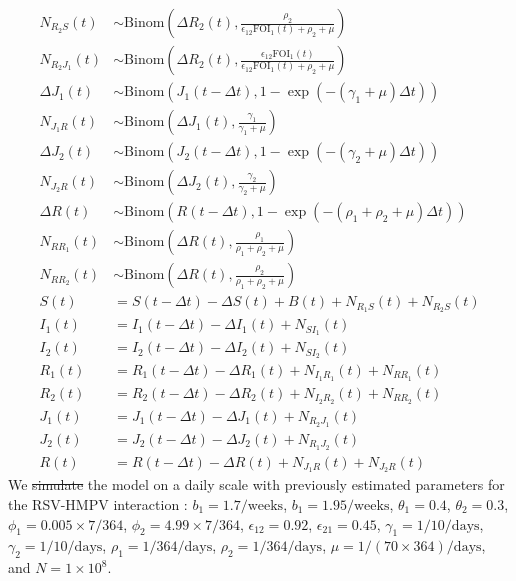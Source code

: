 \documentclass[12pt]{article}
\providecommand{\DIFaddtex}[1]{{\protect\color{blue}\uwave{#1}}} %
\providecommand{\DIFdeltex}[1]{{\protect\color{red}\sout{#1}}}                      %
\providecommand{\DIFaddbegin}{} %
\providecommand{\DIFaddend}{} %
\providecommand{\DIFdelbegin}{} %
\providecommand{\DIFdelend}{} %
\providecommand{\DIFadd}[1]{\texorpdfstring{\DIFaddtex{#1}}{#1}} %
\providecommand{\DIFdel}[1]{\texorpdfstring{\DIFdeltex{#1}}{}} %
\newcommand{\DIFscaledelfig}{0.5}
\newlength{\DIFdelgraphicswidth} %
\newlength{\DIFdelgraphicsheight} %
\newcommand{\DIFaddincludegraphics}[2][]{{\color{blue}\fbox{\DIFOincludegraphics[#1]{#2}}}} %
\newcommand{\DIFdelincludegraphics}[2][]{%
\sbox{\DIFdelgraphicsbox}{\DIFOincludegraphics[#1]{#2}}%
\settoboxwidth{\DIFdelgraphicswidth}{\DIFdelgraphicsbox} %
\settoboxtotalheight{\DIFdelgraphicsheight}{\DIFdelgraphicsbox} %
\scalebox{\DIFscaledelfig}{%
\parbox[b]{\DIFdelgraphicswidth}{\usebox{\DIFdelgraphicsbox}\\[-\baselineskip] \rule{\DIFdelgraphicswidth}{0em}}\llap{\resizebox{\DIFdelgraphicswidth}{\DIFdelgraphicsheight}{%
\setlength{\unitlength}{\DIFdelgraphicswidth}%
\begin{picture}(1,1)%
\thicklines\linethickness{2pt} %
{\color[rgb]{1,0,0}\put(0,0){\framebox(1,1){}}}%
{\color[rgb]{1,0,0}\put(0,0){\line( 1,1){1}}}%
{\color[rgb]{1,0,0}\put(0,1){\line(1,-1){1}}}%
\end{picture}%
}\hspace*{3pt}}} %
} %
\DeclareRobustCommand{\DIFaddbegin}{\DIFOaddbegin \let\includegraphics\DIFaddincludegraphics} %
\DeclareRobustCommand{\DIFaddend}{\DIFOaddend \let\includegraphics\DIFOincludegraphics} %
\DeclareRobustCommand{\DIFdelbegin}{\DIFOdelbegin \let\includegraphics\DIFdelincludegraphics} %
\DeclareRobustCommand{\DIFdelend}{\DIFOaddend \let\includegraphics\DIFOincludegraphics} %
\begin{document}
\begin{align}
N_{R_2S}(t) &\sim \mathrm{Binom}\left(\Delta R_2(t), \frac{\rho_2}{\epsilon_{12} \textrm{FOI}_1(t) + \rho_2 + \mu} \right)\\
N_{R_2J_1}(t) &\sim \mathrm{Binom}\left(\Delta R_2(t), \frac{\epsilon_{12} \textrm{FOI}_1(t)}{\epsilon_{12} \textrm{FOI}_1(t) + \rho_2 + \mu} \right)\\
\Delta J_1(t) &\sim \mathrm{Binom}\left(J_1(t-\Delta t), 1- \exp(-(\gamma_1 + \mu) \Delta t )\right) \\
N_{J_1R}(t) &\sim \mathrm{Binom}\left(\Delta J_1(t), \frac{\gamma_1}{\gamma_1 + \mu} \right)\\
\Delta J_2(t) &\sim \mathrm{Binom}\left(J_2(t-\Delta t), 1- \exp(-(\gamma_2 + \mu) \Delta t )\right) \\
N_{J_2R}(t) &\sim \mathrm{Binom}\left(\Delta J_2(t), \frac{\gamma_2}{\gamma_2 + \mu} \right)\\
\Delta R(t) &\sim \mathrm{Binom}\left(R(t-\Delta t), 1- \exp(-(\rho_1 + \rho_2 + \mu) \Delta t )\right) \\
N_{RR_1}(t) &\sim \mathrm{Binom}\left(\Delta R(t), \frac{\rho_1}{\rho_1 + \rho_2 + \mu} \right)\\
N_{RR_2}(t) &\sim \mathrm{Binom}\left(\Delta R(t), \frac{\rho_2}{\rho_1 + \rho_2 + \mu} \right)\\
S(t) &= S(t-\Delta t) - \Delta S(t) + B(t) + N_{R_1S}(t) + N_{R_2S}(t)\\
I_1(t) &= I_1(t-\Delta t) - \Delta I_1(t) + N_{SI_1}(t) \\
I_2(t) &= I_2(t-\Delta t) - \Delta I_2(t) + N_{SI_2}(t) \\
R_1(t) &= R_1(t-\Delta t) - \Delta R_1(t) + N_{I_1R_1}(t) + N_{RR_1}(t)\\
R_2(t) &= R_2(t-\Delta t) - \Delta R_2(t) + N_{I_2R_2}(t) + N_{RR_2}(t)\\
J_1(t) &= J_1(t-\Delta t) - \Delta J_1(t) + N_{R_2J_1}(t) \\
J_2(t) &= J_2(t-\Delta t) - \Delta J_2(t) + N_{R_1J_2}(t) \\
R(t) &= R(t-\Delta t) - \Delta R(t) + N_{J_1 R}(t) + N_{J_2 R}(t) 
\end{align}
We \DIFdelbegin \DIFdel{simulate }\DIFdelend \DIFaddbegin \DIFadd{simulated }\DIFaddend the model on a daily scale with previously estimated parameters for the RSV-HMPV interaction \citep{bhattacharyya2015cross}:
$b_1=1.7/\mathrm{weeks}$, $b_1=1.95/\mathrm{weeks}$, $\theta_1 = 0.4$, $\theta_2 = 0.3$, $\phi_1=0.005 \times 7/364$, $\phi_2=4.99 \times 7/364$, $\epsilon_{12}=0.92$, $\epsilon_{21}=0.45$, $\gamma_1=1/10/\mathrm{days}$, $\gamma_2=1/10/\mathrm{days}$, $\rho_1=1/364/\mathrm{days}$, $\rho_2=1/364/\mathrm{days}$, $\mu=1/(70\times 364)/\mathrm{days}$, and $N = 1 \times 10^8$.
\end{document}
